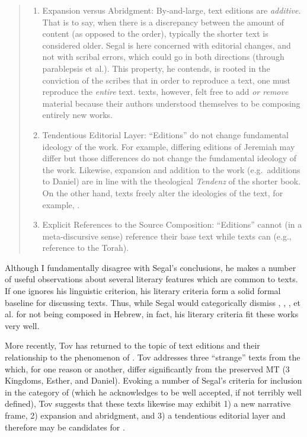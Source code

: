 \begin{quote}
\begin{enumerate}
    \item Expansion versus Abridgment: By-and-large, text editions are \emph{additive}. That is to say, when there is a discrepancy between the amount of content (as opposed to the order), typically the shorter text is considered older. Segal is here concerned with editorial changes, and not with scribal errors, which could go in both directions (through parablepsis et al.). This property, he contends, is rooted in the conviction of the scribes that in order to reproduce a text, one must reproduce the \emph{entire} text.%
        \autocite[24]{segal_henze2005}
    \rwb texts, however, felt free to add \emph{or remove} material because their authors understood themselves to be composing entirely new works.%
        \autocite[24]{segal_henze2005} 

    \item Tendentious Editorial Layer: ``Editions'' do not change fundamental ideology of the work. For example, differing editions of Jeremiah may differ but those differences do not change the fundamental ideology of the work. Likewise, expansion and addition to the work (e.g.~additions to Daniel) are in line with the theological \emph{Tendenz} of the shorter book. On the other hand, \rwb texts freely alter the ideologies of the text, for example, \jub.%
        \autocite[25]{segal_henze2005}

    \item Explicit References to the Source Composition: ``Editions'' cannot (in a meta-discursive sense) reference their base text while \rwb texts can (e.g., \jub reference to the Torah).
\end{enumerate} 
\end{quote} 

Although I fundamentally disagree with Segal's conclusions, he makes a number of useful observations about several literary features which are common to \rwb texts. If one ignores his linguistic criterion, his literary criteria form a solid formal baseline for discussing \rwb texts. Thus, while Segal would categorically dismiss \ga, \ant, \lab, et al. for not being composed in Hebrew, in fact, his literary criteria fit these works very well.

More recently, Tov has returned to the topic of text editions and their relationship to the phenomenon of \rwb.%
    \autocite{tov_krarrer-kraus2008}
Tov addresses three ``strange'' texts from the \lxx which, for one reason or another, differ significantly from the preserved MT (3 Kingdoms, Esther, and Daniel). Evoking a number of Segal's criteria for inclusion in the category of \rwb (which he acknowledges to be well accepted, if not terribly well defined), Tov suggests that these \lxx texts likewise may exhibit 1) a new narrative frame, 2) expansion and abridgment, and 3) a tendentious editorial layer and therefore may be candidates for \rwb. 

